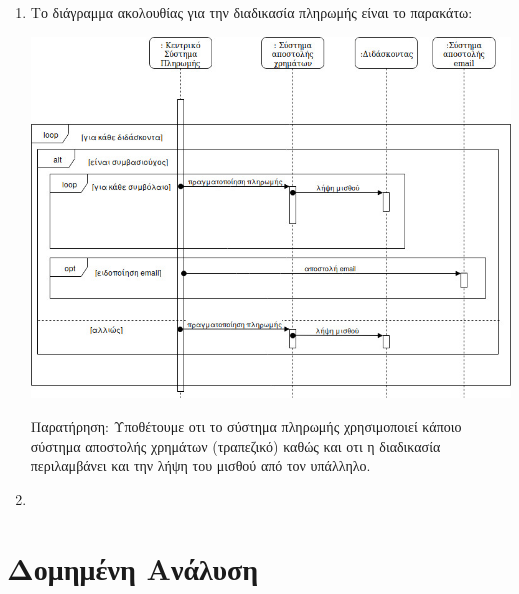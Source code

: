 \documentclass[12pt]{article}
\newcommand\tab[1][1cm]{\hspace*{#1}}
\begin{document}
\begin{enumerate}
\item
Το διάγραμμα ακολουθίας για την διαδικασία πληρωμής είναι το παρακάτω:
\begin{center}
\includegraphics[scale=0.45]{sequence}
\end{center}
\tab Παρατήρηση: Υποθέτουμε οτι το σύστημα πληρωμής χρησιμοποιεί κάποιο 
σύστημα αποστολής χρημάτων (τραπεζικό) καθώς και οτι η 
διαδικασία περιλαμβάνει και την λήψη του μισθού από τον υπάλληλο.

\item
\end{enumerate}

\newpage
\section{Δομημένη Ανάλυση}
\end{document}

